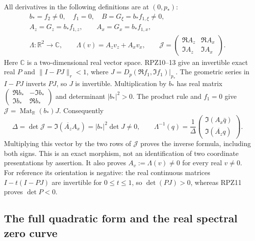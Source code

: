 All derivatives in the following definitions are at $(0,p_*)$:
\[
 \begin{gathered}
 b_*=f_2\ne0,\quad f_1=0,\quad B=G_\xi=b_*f_{1,\xi}\ne0,\\
 A_z=G_z=b_*f_{1,z},\qquad A_x=G_x=b_*f_{1,x},\\
 \Lambda:\mathbb R^2\longrightarrow\mathbb C,\qquad
 \Lambda(v)=A_zv_z+A_xv_x,\qquad
 \mathcal J=\begin{pmatrix}\Re A_z&\Re A_x\\\Im A_z&\Im A_x\end{pmatrix}.
 \end{gathered}
 \tag{RPD3}
\]
Here $\mathbb C$ is a two-dimensional real vector space.  RPZ10--13
give an invertible exact real $P$ and
$\|I-PJ\|_r<1$, where
$J=D_p(\Re f_1,\Im f_1)|_{p_*}$.
The geometric series in $I-PJ$ inverts $PJ$, so $J$ is invertible.
Multiplication by $b_*$ has real matrix
$\left(\begin{smallmatrix}\Re b_*&-\Im b_*\\\Im b_*&\Re b_*\end{smallmatrix}\right)$
and determinant $|b_*|^2>0$.  The product rule and $f_1=0$ give
$\mathcal J=\operatorname{Mat}_{\mathbb R}(b_*)J$.
Consequently
\[
 \Delta=\det\mathcal J=\Im(\overline{A_z}A_x)
       =|b_*|^2\det J\ne0,\qquad
 \Lambda^{-1}(q)=\frac1\Delta
 \begin{pmatrix}\Im(A_x\bar q)\\\Im(\overline{A_z}q)\end{pmatrix}.
 \tag{RPD4}
\]
Multiplying this vector by the two rows of $\mathcal J$ proves the
inverse formula, including both signs.  This is an exact morphism,
not an identification of two coordinate presentations by assertion.
It also proves $A_v:=\Lambda(v)\ne0$ for every real $v\ne0$.
For reference its orientation is negative: the real continuous
matrices $I-t(I-PJ)$ are invertible for $0\le t\le1$, so
$\det(PJ)>0$, whereas RPZ11 proves $\det P<0$.

\subsection{The full quadratic form and the real spectral zero curve}


